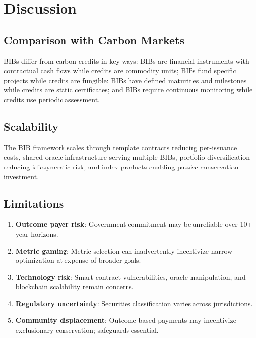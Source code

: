 \section{Discussion}

\label{sec:discussion}

\subsection{Comparison with Carbon Markets}

BIBs differ from carbon credits in key ways: BIBs are financial
instruments with contractual cash flows while credits are commodity
units; BIBs fund specific projects while credits are fungible; BIBs
have defined maturities and milestones while credits are static
certificates; and BIBs require continuous monitoring while credits use
periodic assessment.

\subsection{Scalability}

The BIB framework scales through template contracts reducing
per-issuance costs, shared oracle infrastructure serving multiple BIBs,
portfolio diversification reducing idiosyncratic risk, and index products
enabling passive conservation investment.

\subsection{Limitations}

\begin{enumerate}
  \item \textbf{Outcome payer risk}: Government commitment may be
    unreliable over 10+ year horizons.
  \item \textbf{Metric gaming}: Metric selection can inadvertently
    incentivize narrow optimization at expense of broader goals.
  \item \textbf{Technology risk}: Smart contract vulnerabilities, oracle
    manipulation, and blockchain scalability remain concerns.
  \item \textbf{Regulatory uncertainty}: Securities classification
    varies across jurisdictions.
  \item \textbf{Community displacement}: Outcome-based payments may
    incentivize exclusionary conservation; safeguards essential.
\end{enumerate}


